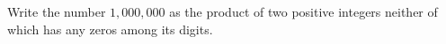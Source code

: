 Write the number $1{,}000{,}000$ as the product of two positive integers neither of which has any zeros among its digits.
